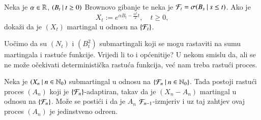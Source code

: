 \begin{zad} \label{zad:23.14}
    Neka je $\alpha \in \mathbb{R}$, $({B_t} \: | \: {t \geq 0})$ Brownovo gibanje te neka je $\mathcal{F}_t = \sigma({B_s} \: | \: {s \leq t})$.
    Ako je
    \begin{equation*}
        X_t := e^{\alpha B_t - \frac{\alpha^2}{2}t}, \quad t \geq 0,
    \end{equation*}
    doka\v zi da je $(X_t)$ martingal u odnosu na $\{\mathcal{F}_t\}$.
\end{zad}

Uo\v cimo da su $(N_t)$ i $(B_t^2)$ submartingali koji se mogu rastaviti na sumu martingala i rastu\' ce funkcije.
Vrijedi li to i op\' cenitije?
U nekom smislu da, ali se ne mo\v ze o\v cekivati deterministi\v cka rastu\' ca funkcija, ve\' c nam treba rastu\' ci proces.

\begin{tm}  \label{tm:23.15}
    Neka je $({X_n} \: | \: {n \in \mathbb{N}_0})$ submartingal u odnosu na $\{{\mathcal{F}_n} \: | \: {n \in \mathbb{N}_0}\}$.
    Tada postoji rastu\' ci proces $(A_n)$ koji je $\{\mathcal{F}_n\}$-adaptiran, takav da je $(X_n - A_n)$ martingal u odnosu na $\{\mathcal{F}_n\}$.
    Mo\v ze se posti\' ci i da je $A_n$ $\mathcal{F}_{n - 1}$-izmjeriv i uz taj zahtjev ovaj proces $(A_n)$ je jedinstveno odre\dj en.
\end{tm}

